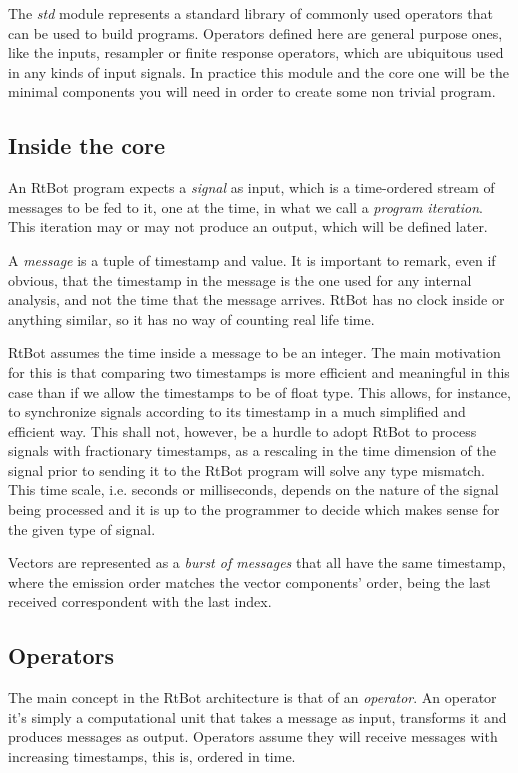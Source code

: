 \documentclass[preprint,1p,times]{elsarticle}
\begin{document}
The \textit{std} module represents a standard library of commonly used operators that can 
be used to build programs. Operators defined here are general purpose ones, like 
the inputs, resampler or finite response operators, which are ubiquitous used in 
any kinds of input signals. In practice this module and the core one will be the 
minimal components you will need in order to create some non trivial program.

\subsection{Inside the core}
An RtBot program expects a \textit{signal} as input, which is a time-ordered stream of 
messages to be fed to it, one at the time, in what we call a \textit{program iteration}. 
This iteration may or may not produce an output, which will be defined later.

A \textit{message} is a tuple of timestamp and value. It is important to remark, even if 
obvious, that the timestamp in the message is the one used for any internal 
analysis, and not the time that the message arrives. RtBot has no clock inside or 
anything similar, so it has no way of counting real life time.


RtBot assumes the time inside a message to be an integer. The main motivation for 
this is that comparing two timestamps is more efficient and meaningful in this 
case than if we allow the timestamps to be of float type. This allows, for 
instance, to synchronize signals according to its timestamp in a much simplified 
and efficient way. This shall not, however, be a hurdle to adopt RtBot to process 
signals with fractionary timestamps, as a rescaling in the time dimension of the 
signal prior to sending it to the RtBot program will solve any type mismatch. This 
time scale, i.e. seconds or milliseconds, depends on the nature of the signal 
being processed and it is up to the programmer to decide which makes sense for the 
given type of signal.


Vectors are represented as a \textit{burst of messages} that all have the same timestamp,
where the emission order matches the vector components' order, being the last received
correspondent with the last index.

\subsection{Operators}
The main concept in the RtBot architecture is that of an \textit{operator}. An operator 
it’s simply a computational unit that takes a message as input, transforms it and produces 
messages as output. Operators assume they will receive messages with 
increasing timestamps, this is, ordered in time.
\end{document}
